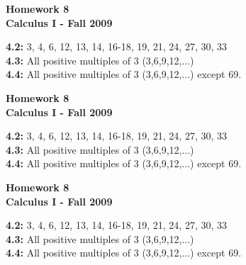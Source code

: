 \documentclass[12pt]{article}
\begin{document}
\begin{center}
{\large \bf Homework 8}\\
\bf{Calculus I - Fall 2009}
\end{center}

{\bf 4.2:}  3, 4, 6, 12, 13, 14, 16-18, 19, 21, 24, 27, 30, 33\\

{\bf 4.3:}  All positive multiples of 3 (3,6,9,12,...)\\

{\bf 4.4:}  All positive multiples of 3 (3,6,9,12,...) except 69.\\

\vspace{.5 in.}
\begin{center}
{\large \bf Homework 8}\\
\bf{Calculus I - Fall 2009}
\end{center}

{\bf 4.2:}  3, 4, 6, 12, 13, 14, 16-18, 19, 21, 24, 27, 30, 33\\

{\bf 4.3:}  All positive multiples of 3 (3,6,9,12,...)\\

{\bf 4.4:}  All positive multiples of 3 (3,6,9,12,...) except 69.\\

\vspace{.5 in.}
\begin{center}
{\large \bf Homework 8}\\
\bf{Calculus I - Fall 2009}
\end{center}

{\bf 4.2:}  3, 4, 6, 12, 13, 14, 16-18, 19, 21, 24, 27, 30, 33\\

{\bf 4.3:}  All positive multiples of 3 (3,6,9,12,...)\\

{\bf 4.4:}  All positive multiples of 3 (3,6,9,12,...) except 69.\\

\vspace{.5 in.}
\end{document}
